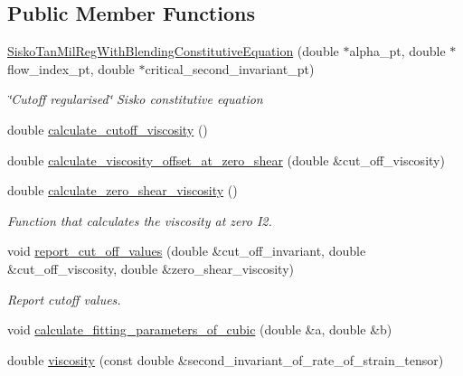 \subsection*{Public Member Functions}
\begin{DoxyCompactItemize}
\item 
\hyperlink{classoomph_1_1SiskoTanMilRegWithBlendingConstitutiveEquation_a284ae14a748f8650c68f6e6b6bb8b742}{Sisko\+Tan\+Mil\+Reg\+With\+Blending\+Constitutive\+Equation} (double $\ast$alpha\+\_\+pt, double $\ast$flow\+\_\+index\+\_\+pt, double $\ast$critical\+\_\+second\+\_\+invariant\+\_\+pt)
\begin{DoxyCompactList}\small\item\em \char`\"{}\+Cutoff regularised\char`\"{} Sisko constitutive equation \end{DoxyCompactList}\item 
double \hyperlink{classoomph_1_1SiskoTanMilRegWithBlendingConstitutiveEquation_afa231563fc5db2dd262f6536b461cd04}{calculate\+\_\+cutoff\+\_\+viscosity} ()
\item 
double \hyperlink{classoomph_1_1SiskoTanMilRegWithBlendingConstitutiveEquation_a4aa9049f9acfd25208deb26d011350fc}{calculate\+\_\+viscosity\+\_\+offset\+\_\+at\+\_\+zero\+\_\+shear} (double \&cut\+\_\+off\+\_\+viscosity)
\item 
double \hyperlink{classoomph_1_1SiskoTanMilRegWithBlendingConstitutiveEquation_a4fe343a1c95f24fde634df78b7fc31cc}{calculate\+\_\+zero\+\_\+shear\+\_\+viscosity} ()
\begin{DoxyCompactList}\small\item\em Function that calculates the viscosity at zero I2. \end{DoxyCompactList}\item 
void \hyperlink{classoomph_1_1SiskoTanMilRegWithBlendingConstitutiveEquation_ab45c38b298775d7225bc8f03fa045294}{report\+\_\+cut\+\_\+off\+\_\+values} (double \&cut\+\_\+off\+\_\+invariant, double \&cut\+\_\+off\+\_\+viscosity, double \&zero\+\_\+shear\+\_\+viscosity)
\begin{DoxyCompactList}\small\item\em Report cutoff values. \end{DoxyCompactList}\item 
void \hyperlink{classoomph_1_1SiskoTanMilRegWithBlendingConstitutiveEquation_a0a0d5f636cfcfefa838c95d24e12eed7}{calculate\+\_\+fitting\+\_\+parameters\+\_\+of\+\_\+cubic} (double \&a, double \&b)
\item 
double \hyperlink{classoomph_1_1SiskoTanMilRegWithBlendingConstitutiveEquation_aab87a911e6c87d5126240a756ea1a5fe}{viscosity} (const double \&second\+\_\+invariant\+\_\+of\+\_\+rate\+\_\+of\+\_\+strain\+\_\+tensor)

\end{DoxyCompactItemize}
